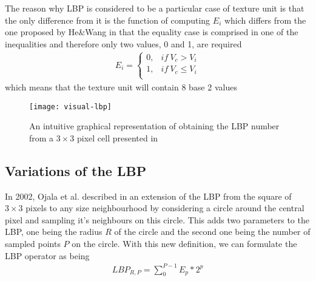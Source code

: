 The reason why LBP is considered to be a particular case of texture unit is that the only difference from it is the function of computing $E_i$ which differs from the one proposed by He\&Wang in that the equality case is comprised in one of the inequalities and therefore only two values, 0 and 1, are required
\begin{align}
E_i = \begin{cases}
0, & if\ V_c > V_i \\
1, & if\ V_c \leq V_i \\
\end{cases}
\end{align}
which means that the texture unit will contain 8 base 2 values

\begin{figure}[h]
	\begin{center}
		\texttt{[image: visual-lbp]}
		\caption[Visual representation of \textbf{LBP} computation]{An intuitive graphical representation of obtaining the LBP number from a $3\times3$ pixel cell presented in \cite{lu2014divided}}
	\end{center}
\end{figure}

\subsection{Variations of the LBP}
In 2002, Ojala et al. described in \cite{OjalaPM02} an extension of the LBP from the square of $3\times3$ pixels to any size neighbourhood by considering a circle around the central pixel and sampling it's neighbours on this circle. This adds two parameters to the LBP, one being the radius $R$ of the circle and the second one being the number of sampled points $P$ on the circle.  With this new definition, we can formulate the LBP operator as being
\begin{align}
	LBP_{R,P} = \sum_{0}^{P-1}E_p*2^p
\end{align}

